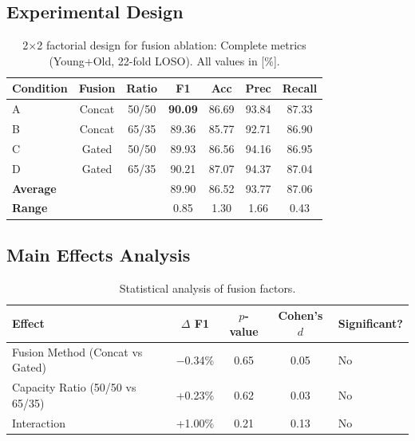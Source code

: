 \documentclass{article}
\begin{document}
\subsection{Experimental Design}

\begin{table}[htbp]
    \centering
    \caption{2$\times$2 factorial design for fusion ablation: Complete metrics (Young+Old, 22-fold LOSO). All values in [\%].}
    \label{tab:factorial}
    \begin{tabular}{lcccccc}
        \toprule
        \textbf{Condition} & \textbf{Fusion} & \textbf{Ratio} & \textbf{F1} & \textbf{Acc} & \textbf{Prec} & \textbf{Recall} \\
        \midrule
        A & Concat & 50/50 & \textbf{90.09} & 86.69 & 93.84 & 87.33 \\
        B & Concat & 65/35 & 89.36 & 85.77 & 92.71 & 86.90 \\
        C & Gated & 50/50 & 89.93 & 86.56 & 94.16 & 86.95 \\
        D & Gated & 65/35 & 90.21 & 87.07 & 94.37 & 87.04 \\
        \midrule
        \multicolumn{3}{l}{\textbf{Average}} & 89.90 & 86.52 & 93.77 & 87.06 \\
        \multicolumn{3}{l}{\textbf{Range}} & 0.85 & 1.30 & 1.66 & 0.43 \\
        \bottomrule
    \end{tabular}
\end{table}

\subsection{Main Effects Analysis}

\begin{table}[htbp]
    \centering
    \caption{Statistical analysis of fusion factors.}
    \label{tab:fusion_stats}
    \begin{tabular}{lcccl}
        \toprule
        \textbf{Effect} & \textbf{$\Delta$ F1} & \textbf{$p$-value} & \textbf{Cohen's $d$} & \textbf{Significant?} \\
        \midrule
        Fusion Method (Concat vs Gated) & $-$0.34\% & 0.65 & 0.05 & No \\
        Capacity Ratio (50/50 vs 65/35) & +0.23\% & 0.62 & 0.03 & No \\
        Interaction & +1.00\% & 0.21 & 0.13 & No \\
        \bottomrule
    \end{tabular}
\end{table}
\end{document}
